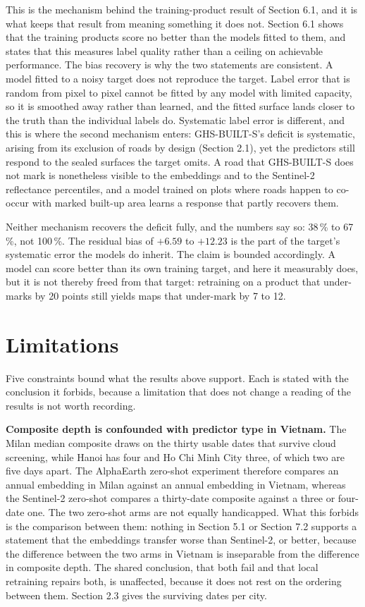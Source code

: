 \documentclass[11pt,a4paper]{article}
\begin{document}
This is the mechanism behind the training-product result of Section 6.1, and it
is what keeps that result from meaning something it does not. Section 6.1 shows
that the training products score no better than the models fitted to them, and
states that this measures label quality rather than a ceiling on achievable
performance. The bias recovery
is why the two statements are consistent. A model fitted to a noisy target does
not reproduce the target. Label error that is random from pixel to pixel cannot
be fitted by any model with limited capacity, so it is smoothed away rather than
learned, and the fitted surface lands closer to the truth than the individual
labels do. Systematic label error is different, and this is where the second
mechanism enters: GHS-BUILT-S's deficit is systematic, arising from its exclusion
of roads by design (Section 2.1), yet the predictors still respond to the sealed
surfaces the target omits. A road that GHS-BUILT-S does not mark is nonetheless
visible to the embeddings and to the Sentinel-2 reflectance percentiles, and a
model trained on plots where roads happen to co-occur with marked built-up area
learns a response that partly recovers them.

Neither mechanism recovers the deficit fully, and the numbers say so: 38\,\% to
67\,\%, not 100\,\%. The residual bias of $+6.59$ to $+12.23$ is the part of the
target's systematic error the models do inherit. The claim is bounded accordingly.
A model can score better than its own training target, and here it measurably
does, but it is not thereby freed from that target: retraining on a product that
under-marks by 20 points still yields maps that under-mark by 7 to 12.

\section{Limitations}

Five constraints bound what the results above support. Each is stated with the
conclusion it forbids, because a limitation that does not change a reading of
the results is not worth recording.

\textbf{Composite depth is confounded with predictor type in Vietnam.} The Milan
median composite draws on the thirty usable dates that survive cloud screening,
while Hanoi has four and Ho Chi Minh City three, of which two are five days
apart. The AlphaEarth zero-shot experiment therefore compares an annual
embedding in Milan against an annual embedding in Vietnam, whereas the
Sentinel-2 zero-shot compares a thirty-date composite against a three or
four-date one. The two zero-shot arms are not equally handicapped. What this
forbids is the comparison between them: nothing in Section 5.1 or Section 7.2
supports a statement that the embeddings transfer worse than Sentinel-2, or
better, because the difference between the two arms in Vietnam is inseparable
from the difference in composite depth. The shared conclusion, that both fail
and that local retraining repairs both, is unaffected, because it does not rest
on the ordering between them. Section 2.3 gives the surviving dates per city.
\end{document}
